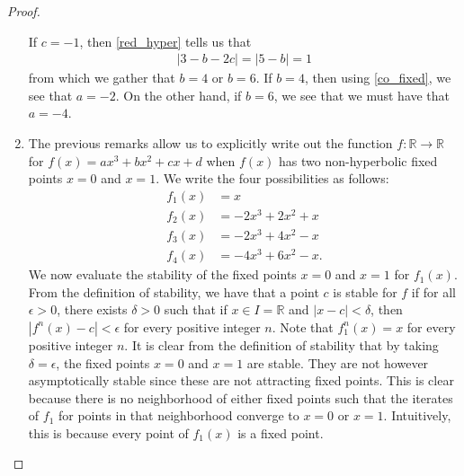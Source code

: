 \begin{proof}
\begin{enumerate}
      If $c=-1$, then \eqref{red_hyper} tells us that
      \begin{align*}
        |3-b-2c| = |5 -b| = 1
      \end{align*}
      from which we gather that $b=4$ or $b=6$. If $b=4$, then using \eqref{co_fixed}, we see that $a=-2$. On the other hand, if
      $b=6$, we see that we must have that $a=-4$.
    \item The previous remarks allow us to explicitly write
      out the function $f:\mathbb{R}\to\mathbb{R}$ for $f(x) = ax^3 + bx^2 + cx + d$ when $f(x)$ has two non-hyperbolic fixed points $x=0$ and $x=1$.
      We write the four possibilities as follows:
      \begin{align*}
        f_1(x) &= x \\
        f_2(x) &= -2x^3 + 2x^2 + x \\
        f_3(x) &= -2x^3 + 4x^2 - x \\
        f_4(x) &= -4x^3 + 6x^2 - x.
      \end{align*}
      We now evaluate the stability of the fixed points $x = 0$ and $x = 1$ for $f_1(x)$.
      From the definition of stability, we have that a point $c$ is stable for $f$ if for all $\epsilon > 0$,
      there exists $\delta >0$ such that if $x \in I = \mathbb{R}$ and $|x - c| < \delta$, then
      $|f^n(x) - c| < \epsilon$ for every positive integer $n$. Note that $f_1^n(x) = x$ for every positive integer $n$. It is clear from the
      definition of stability that by taking $\delta = \epsilon$, the fixed points $x=0$ and $x=1$ are stable. They are not however asymptotically stable since
      these are not attracting fixed points. This is clear because there is no neighborhood of either fixed points such that
      the iterates of $f_1$ for points in that neighborhood converge to $x=0$ or $x=1$. Intuitively, this is because
      every point of $f_1(x)$ is a fixed point.


\end{enumerate}
\end{proof}
